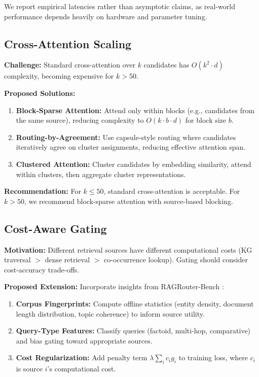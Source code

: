 \documentclass[11pt,a4paper]{article}
\begin{document}
We report empirical latencies rather than asymptotic claims, as real-world performance depends heavily on hardware and parameter tuning.

\subsection{Cross-Attention Scaling}
\label{sec:cross_attention_scaling}

\textbf{Challenge:} Standard cross-attention over $k$ candidates has $O(k^2 \cdot d)$ complexity, becoming expensive for $k > 50$.

\textbf{Proposed Solutions:}
\begin{enumerate}
    \item \textbf{Block-Sparse Attention:} Attend only within blocks (e.g., candidates from the same source), reducing complexity to $O(k \cdot b \cdot d)$ for block size $b$.
    
    \item \textbf{Routing-by-Agreement:} Use capsule-style routing \citep{sabour2017dynamic} where candidates iteratively agree on cluster assignments, reducing effective attention span.
    
    \item \textbf{Clustered Attention:} Cluster candidates by embedding similarity, attend within clusters, then aggregate cluster representations.
\end{enumerate}

\textbf{Recommendation:} For $k \leq 50$, standard cross-attention is acceptable. For $k > 50$, we recommend block-sparse attention with source-based blocking.

\subsection{Cost-Aware Gating}
\label{sec:cost_aware}

\textbf{Motivation:} Different retrieval sources have different computational costs (KG traversal $>$ dense retrieval $>$ co-occurrence lookup). Gating should consider cost-accuracy trade-offs.

\textbf{Proposed Extension:} Incorporate insights from RAGRouter-Bench \citep{ragrouter2024}:
\begin{enumerate}
    \item \textbf{Corpus Fingerprints:} Compute offline statistics (entity density, document length distribution, topic coherence) to inform source utility.
    
    \item \textbf{Query-Type Features:} Classify queries (factoid, multi-hop, comparative) and bias gating toward appropriate sources.
    
    \item \textbf{Cost Regularization:} Add penalty term $\lambda \sum_i c_i g_i$ to training loss, where $c_i$ is source $i$'s computational cost.
\end{enumerate}
\end{document}
